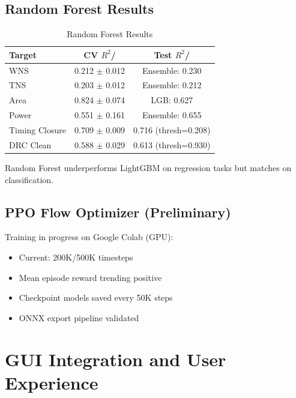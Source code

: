 \documentclass[10pt,conference]{IEEEtran}
\newcommand{\AUC}{\text{AUC}}
\begin{document}
\subsection{Random Forest Results}

\begin{table}[t]
\centering
\caption{Random Forest Results}
\label{tab:rf_results}
\begin{tabular}{@{}lcc@{}}
\toprule
Target & CV $R^2$/\AUC{} & Test $R^2$/\AUC{} \\
\midrule
WNS & 0.212 $\pm$ 0.012 & Ensemble: 0.230 \\
TNS & 0.203 $\pm$ 0.012 & Ensemble: 0.212 \\
Area & 0.824 $\pm$ 0.074 & LGB: 0.627 \\
Power & 0.551 $\pm$ 0.161 & Ensemble: 0.655 \\
Timing Closure & 0.709 $\pm$ 0.009 & 0.716 (thresh=0.208) \\
DRC Clean & 0.588 $\pm$ 0.029 & 0.613 (thresh=0.930) \\
\bottomrule
\end{tabular}
\end{table}

Random Forest underperforms LightGBM on regression tasks but matches on classification.

\subsection{PPO Flow Optimizer (Preliminary)}

Training in progress on Google Colab (GPU):
\begin{itemize}
    \item Current: 200K/500K timesteps
    \item Mean episode reward trending positive
    \item Checkpoint models saved every 50K steps
    \item ONNX export pipeline validated
\end{itemize}


\section{GUI Integration and User Experience}
\label{sec:gui_integration}
\end{document}
